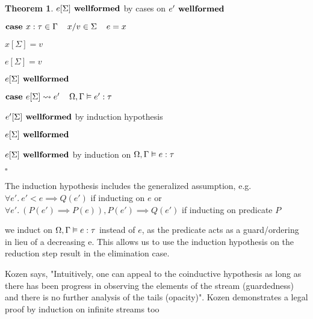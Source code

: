 \documentclass[acmsmall]{acmart}
\theoremstyle{definition}
\newtheorem{theorem}{Theorem}[section]
\begin{document}
\begin{theorem}
  \item \Z\Z $e[\Sigma] \textbf{ wellformed}$ by cases on $e' \textbf{ wellformed}$

  \item \Z {}

  \item \Z $\textbf{case } 
    x : \tau \in \Gamma
    \hspace{4mm} 
    x \slash v \in \Sigma
    \hspace{4mm} 
    e = x
  $
  \item \Z\Z $x[\Sigma] = v$
  \item \Z\Z $e[\Sigma] = v$
  \item \Z\Z $e[\Sigma] \textbf{ wellformed}$

  \item \Z $\textbf{case } 
    e[\Sigma] \rightsquigarrow e' 
    \hspace{4mm} 
    \Omega, \Gamma \vDash e' : \tau
  $ 
  \item \Z\Z $e'[\Sigma] \textbf{ wellformed}$ by induction hypothesis
  \item \Z\Z $e[\Sigma] \textbf{ wellformed}$

  \item \Z $e[\Sigma] \textbf{ wellformed}$ by induction on $\Omega, \Gamma \vDash e : \tau$
  \item $\square$
  \item {}
\end{theorem}

\noindent
{} The induction hypothesis includes the generalized assumption, e.g. $\forall e' .\ e' < e \implies Q(e')$ if inducting on $e$ or $\forall e' .\ (P(e') \implies P(e)), P(e') \implies Q(e')$ if inducting on predicate $P$

\noindent
{} we induct on $\Omega, \Gamma \vDash e : \tau$ instead of $e$, as the predicate acts as a guard/ordering in lieu of a decreasing e.
This allows us to use the induction hypothesis on the reduction step result in the elimination case.

\noindent
{} Kozen says, "Intuitively, one can appeal to the coinductive hypothesis as long as there
has been progress in observing the elements of the stream (guardedness) and there is no
further analysis of the tails (opacity)".  Kozen demonstrates a legal proof by induction on infinite streams too

\end{document}
